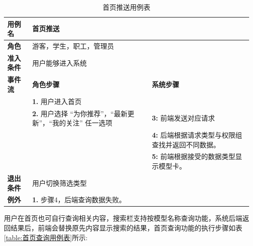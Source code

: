 \begin{table}[H]
  \centering
  \renewcommand\arraystretch{1.1}
  \small
  \caption{首页推送用例表}
  \label{table:首页推送用例表}
  \setlength{\tabcolsep}{4mm}
  \begin{tabular}{|p{2cm}|p{5.75cm}|p{5.75cm}|}
    \hline \textbf{用例名} & \multicolumn{2}{l|}{首页推送} \\
    \hline \textbf{角色} & \multicolumn{2}{l|}{游客，学生，职工，管理员} \\
    \hline \textbf{准入条件} & \multicolumn{2}{l|}{用户能够进入系统} \\
    \hline \textbf{事件流} & \textbf{角色步骤} & \textbf{系统步骤} \\
    \hline \multirow{3}{*}{~} & \textbf{1.} 用户进入首页  &    \\
    \cline{2-3} & \textbf{2.} 用户选择 ``为你推荐''，``最新更新''，``我的关注'' 任一选项 & \textbf{3:} 前端发送对应请求 \\
    \cline{2-3} &  & \textbf{4:} 后端根据请求类型与权限组查找并返回不同数据。 \\
    \cline{2-3} &  & \textbf{5:} 前端根据接受的数据类型显示模型卡。 \\
    \hline \textbf{退出条件}  & \multicolumn{2}{l|}{用户切换筛选类型} \\
    \hline \multirow{1}{*}{\textbf{例外}} & \multicolumn{2}{l|}{\textbf{1.} 步骤4，后端查询数据失败。} \\
    \hline
  \end{tabular}
\end{table}

用户在首页也可自行查询相关内容，搜索栏支持按模型名称查询功能，系统后端返回结果后，前端会替换原先内容显示搜索的结果，首页查询功能的执行步骤如表\ref{table:首页查询用例表}所示:

